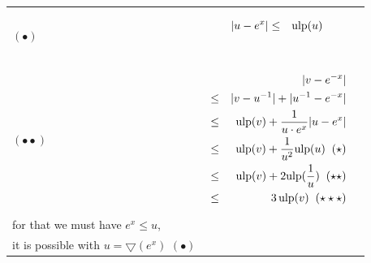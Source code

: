 \documentclass[12pt]{amsart}
\def\pinf{\bigtriangleup}
\def\minf{\bigtriangledown}
\def\ulp{{\rm ulp}}
\begin{document}
\begin{center}
\begin{tabular}{l l l}

\begin{minipage}{2.5cm}


${\textnormal{error}}(u)$


$u \leftarrow \minf(e^x)$\\
$(\bullet)$

\end{minipage} &
\begin{minipage}{7.5cm}

\begin{eqnarray}\nonumber
  |u-e^x| &\leq& \ulp(u)\\\nonumber
\end{eqnarray}

\end{minipage} &
\begin{minipage}{6cm}
{\hspace{7cm}}
\end{minipage}\\%
\begin{minipage}{2.5cm}
${\textnormal{error}}(v)$


$v \leftarrow \pinf({u}^{-1}) $\\
$(\bullet\bullet)$
\end{minipage} &
\begin{minipage}{7.5cm}



\begin{eqnarray}\nonumber
  &&|v-e^{-x}| \\\nonumber
  &       \leq&  |v - u^{-1}| +  |u^{-1}  - e^{-x}|\\\nonumber
  &       \leq& \ulp(v) + \frac{1}{u \cdot e^x} |u-e^{x}|\\\nonumber
  &       \leq& \ulp(v) + \frac{1}{u^2} \ulp(u)\;\;(\star)\\\nonumber
  &       \leq& \ulp(v) + 2 \ulp(\frac{1}{u})\;\;(\star\star)\\\nonumber
  &       \leq& 3 \, \ulp(v)\;\;(\star\star\star)
\end{eqnarray}


\end{minipage} &
\begin{minipage}{6cm}

$(\star)$

With $\frac{1}{u} \leq \frac{1}{e^x}$,\\
for that we must have $e^x \leq u$,\\
it is possible with $u=\minf(e^x)$ $(\bullet)$


\end{minipage}
\end{tabular}
\end{center}
\end{document}
